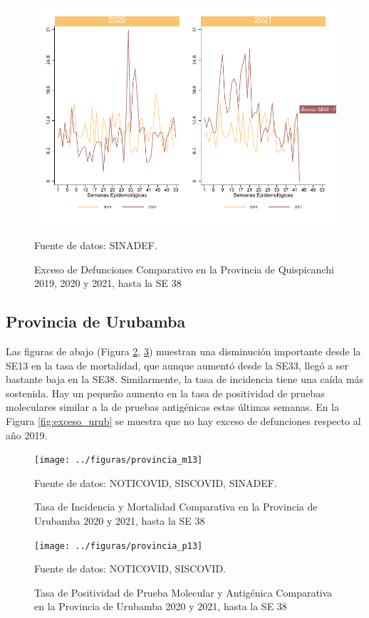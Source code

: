 \documentclass[12pt,a4paper,openany]{book}
\begin{document}
	\begin{figure}[h]
	\caption{Exceso de Defunciones Comparativo en la Provincia de Quispicanchi 2019, 2020 y 2021, hasta la SE 38}\label{fig:exceso_quisp}
	\begin{center}
		\includegraphics[width=0.7\linewidth]{../figuras/exceso_12}
	\end{center}
	{\footnotesize {Fuente de datos: SINADEF.}}
	\end{figure}

\clearpage

	\subsection*{Provincia de Urubamba}
	\noindent Las figuras de abajo (Figura \ref{fig:inc_urub}, \ref{fig:positividad_urub})  muestran una disminución importante desde la SE13 en la tasa de mortalidad, que aunque aumentó desde la SE33, llegó a ser bastante baja en la SE38. Similarmente, la tasa de incidencia tiene una caída más sostenida. Hay un pequeño aumento en la tasa de positividad de pruebas moleculares similar a la de pruebas antigénicas estas últimas semanas. En la Figura \ref{fig:exceso_urub} se muestra que no hay exceso de defunciones respecto al año 2019.

	\begin{figure}[h]
	\caption{Tasa de Incidencia y Mortalidad Comparativa en la Provincia de Urubamba 2020 y 2021, hasta la SE 38}\label{fig:inc_urub}
	\begin{center}
		\texttt{[image: ../figuras/provincia\_m13]}
	\end{center}
	{\footnotesize {Fuente de datos: NOTICOVID, SISCOVID, SINADEF.}}
	\end{figure}

	\begin{figure}[h]
	\caption{Tasa de Positividad de Prueba Molecular y Antigénica Comparativa en la Provincia de Urubamba 2020 y 2021, hasta la SE 38}\label{fig:positividad_urub}
	\begin{center}
		\texttt{[image: ../figuras/provincia\_p13]}
	\end{center}
	{\footnotesize {Fuente de datos: NOTICOVID, SISCOVID.}}
	\end{figure}
\end{document}
